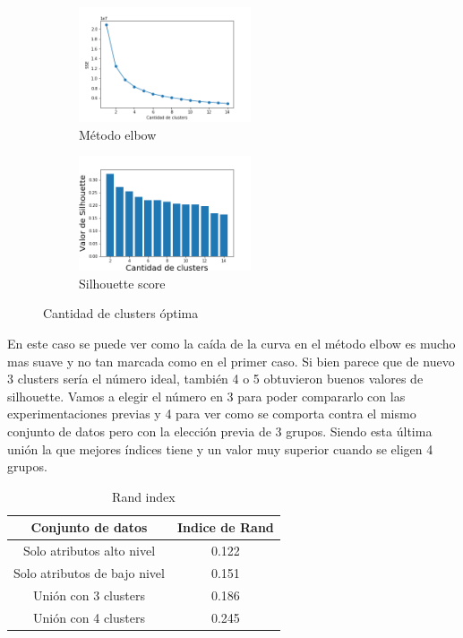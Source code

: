 \begin{figure}[H]
    \begin{subfigure}{.4\textwidth}
        \centering
        \includegraphics[width = 2in]{img/kmeans/elbow-join.png}
        \caption{Método elbow}
    \end{subfigure}
    \begin{subfigure}{.4\textwidth}
        \centering
        \includegraphics[width = 2in]{img/kmeans/silhouette-join.png}
        \caption{Silhouette score}
    \end{subfigure}
    \caption{Cantidad de clusters óptima}
    \label{fig:elbow-silhouette-join}
\end{figure}

En este caso se puede ver como la caída de la curva en el método elbow es mucho mas suave y no tan marcada como en el primer caso. Si bien parece que de nuevo 3 clusters sería el número ideal, también 4 o 5 obtuvieron buenos valores de silhouette. Vamos a elegir el número en 3 para poder compararlo con las experimentaciones previas y 4 para ver como se comporta contra el mismo conjunto de datos pero con la elección previa de 3 grupos. Siendo esta última unión la que mejores índices tiene y un valor muy superior cuando se eligen 4 grupos.

\begin{table}[H]
    \centering
    \begin{tabular}{|c|c|}
        \hline
        Conjunto de datos & Indice de Rand \\
        \hline
        Solo atributos alto nivel & 0.122 \\
        Solo atributos de bajo nivel & 0.151 \\
        Unión con 3 clusters & 0.186 \\
        Unión con 4 clusters & 0.245 \\
        \hline
    \end{tabular}
    \caption{Rand index}
    \label{tab:rand-kmeans-af-3-aa-3-join-3-join-4}
\end{table}

